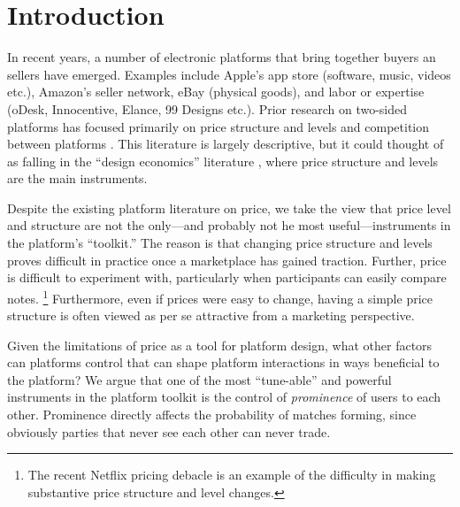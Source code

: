 
\section{Introduction} 

In recent years, a number of electronic platforms that bring together
buyers an sellers have emerged. Examples include Apple's app store
(software, music, videos etc.), Amazon's seller network, eBay
(physical goods), and labor or expertise (oDesk, Innocentive, Elance,
99 Designs etc.). Prior research on two-sided platforms has focused
primarily on price structure and levels and competition between
platforms \citep{armstrong2006competition, rochet2003platform,
  rochet2006two, parker2005two}. This literature is largely descriptive, but it could
thought of as falling in the ``design economics'' literature
\citep{roth2002economist}, where price structure and levels are the
main instruments.



Despite the existing platform literature on price, we take the view
that price level and structure are not the only---and probably not he
most useful---instruments in the platform's ``toolkit.'' The reason is
that changing price structure and levels proves difficult in practice
once a marketplace has gained traction. Further, price is difficult to
experiment with, particularly when participants can easily compare
notes. \footnote{The recent Netflix pricing debacle is an example of
  the difficulty in making substantive price structure and level
  changes.} Furthermore, even if prices were easy to change, having a
simple price structure is often viewed as per se attractive from a
marketing perspective.

Given the limitations of price as a tool for platform design, what
other factors can platforms control that can shape platform
interactions in ways beneficial to the platform? We argue that one of
the most ``tune-able'' and powerful instruments in the platform
toolkit is the control of \emph{prominence} of users to each
other. Prominence directly affects the probability of matches forming,
since obviously parties that never see each other can never trade.

